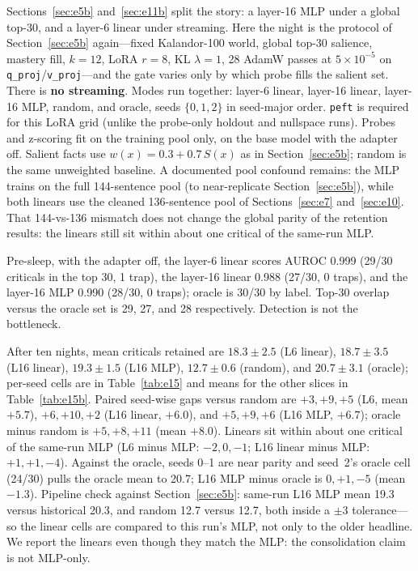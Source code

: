 \documentclass[11pt,a4paper]{article}
\begin{document}
Sections~\ref{sec:e5b} and~\ref{sec:e11b} split the story: a layer-16 MLP under a global top-30, and a layer-6 linear under streaming.
Here the night is the protocol of Section~\ref{sec:e5b} again---fixed Kalandor-100 world, global top-30 salience, mastery fill, $k{=}12$, LoRA $r{=}8$, KL $\lambda{=}1$, 28 AdamW passes at $5{\times}10^{-5}$ on \texttt{q\_proj}/\texttt{v\_proj}---and the gate varies only by which probe fills the salient set.
There is \textbf{no streaming}.
Modes run together: layer-6 linear, layer-16 linear, layer-16 MLP, random, and oracle, seeds $\{0,1,2\}$ in seed-major order.
\texttt{peft} is required for this LoRA grid (unlike the probe-only holdout and nullspace runs).
Probes and z-scoring fit on the training pool only, on the base model with the adapter off.
Salient facts use $w(x)=0.3+0.7\,S(x)$ as in Section~\ref{sec:e5b}; random is the same unweighted baseline.
A documented pool confound remains: the MLP trains on the full 144-sentence pool (to near-replicate Section~\ref{sec:e5b}), while both linears use the cleaned 136-sentence pool of Sections~\ref{sec:e7} and~\ref{sec:e10}.
That 144-vs-136 mismatch does not change the global parity of the retention results: the linears still sit within about one critical of the same-run MLP.

Pre-sleep, with the adapter off, the layer-6 linear scores AUROC 0.999 (29/30 criticals in the top 30, 1 trap), the layer-16 linear 0.988 (27/30, 0 traps), and the layer-16 MLP 0.990 (28/30, 0 traps); oracle is 30/30 by label.
Top-30 overlap versus the oracle set is 29, 27, and 28 respectively.
Detection is not the bottleneck.

After ten nights, mean criticals retained are $18.3{\pm}2.5$ (L6 linear), $18.7{\pm}3.5$ (L16 linear), $19.3{\pm}1.5$ (L16 MLP), $12.7{\pm}0.6$ (random), and $20.7{\pm}3.1$ (oracle); per-seed cells are in Table~\ref{tab:e15} and means for the other slices in Table~\ref{tab:e15b}.
Paired seed-wise gaps versus random are $+3,+9,+5$ (L6, mean $+5.7$), $+6,+10,+2$ (L16 linear, $+6.0$), and $+5,+9,+6$ (L16 MLP, $+6.7$); oracle minus random is $+5,+8,+11$ (mean $+8.0$).
Linears sit within about one critical of the same-run MLP (L6 minus MLP: $-2,0,-1$; L16 linear minus MLP: $+1,+1,-4$).
Against the oracle, seeds 0--1 are near parity and seed~2's oracle cell (24/30) pulls the oracle mean to 20.7; L16 MLP minus oracle is $0,+1,-5$ (mean $-1.3$).
Pipeline check against Section~\ref{sec:e5b}: same-run L16 MLP mean 19.3 versus historical 20.3, and random 12.7 versus 12.7, both inside a $\pm 3$ tolerance---so the linear cells are compared to this run's MLP, not only to the older headline.
We report the linears even though they match the MLP: the consolidation claim is not MLP-only.
\end{document}
